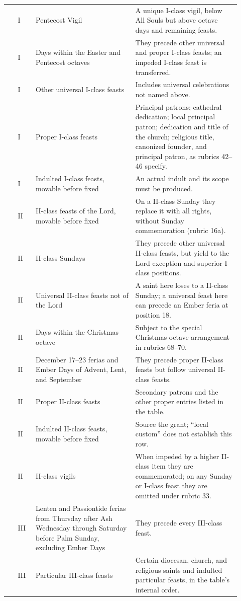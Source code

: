 \begin{longtable}{>{\centering\arraybackslash}p{0.045\linewidth}>{\centering\arraybackslash}p{0.07\linewidth}>{\raggedright\arraybackslash}p{0.39\linewidth}>{\raggedright\arraybackslash}p{0.41\linewidth}}
9 & I & Pentecost Vigil & A unique I-class vigil, below All Souls but above octave days and remaining feasts.\\
10 & I & Days within the Easter and Pentecost octaves & They precede other universal and proper I-class feasts; an impeded I-class feast is transferred.\\
11 & I & Other universal I-class feasts & Includes universal celebrations not named above.\\
12 & I & Proper I-class feasts & Principal patrons; cathedral dedication; local principal patron; dedication and title of the church; religious title, canonized founder, and principal patron, as rubrics 42--46 specify.\\
13 & I & Indulted I-class feasts, movable before fixed & An actual indult and its scope must be produced.\\
\midrule
14 & II & II-class feasts of the Lord, movable before fixed & On a II-class Sunday they replace it with all rights, without Sunday commemoration (rubric 16a).\\
15 & II & II-class Sundays & They precede other universal II-class feasts, but yield to the Lord exception and superior I-class positions.\\
16 & II & Universal II-class feasts not of the Lord & A saint here loses to a II-class Sunday; a universal feast here can precede an Ember feria at position 18.\\
17 & II & Days within the Christmas octave & Subject to the special Christmas-octave arrangement in rubrics 68--70.\\
18 & II & December 17--23 ferias and Ember Days of Advent, Lent, and September & They precede proper II-class feasts but follow universal II-class feasts.\\
19 & II & Proper II-class feasts & Secondary patrons and the other proper entries listed in the table.\\
20 & II & Indulted II-class feasts, movable before fixed & Source the grant; “local custom” does not establish this row.\\
21 & II & II-class vigils & When impeded by a higher II-class item they are commemorated; on any Sunday or I-class feast they are omitted under rubric 33.\\
\midrule
22 & III & Lenten and Passiontide ferias from Thursday after Ash Wednesday through Saturday before Palm Sunday, excluding Ember Days & They precede every III-class feast.\\
23 & III & Particular III-class feasts & Certain diocesan, church, and religious saints and indulted particular feasts, in the table's internal order.\\

\end{longtable}
